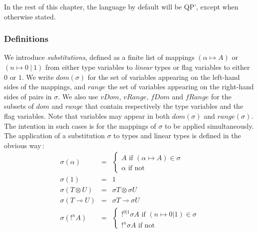In the rest of this chapter, the language by default will be QP', except when otherwise stated.

\subsubsection{Definitions}

\begin{defn} We introduce \textit{substitutions}, defined as a finite list of mappings $(\alpha \mapsto A)$ or $(n \mapsto 0 ~|~ 1)$
	from either type variables to \textit{linear} types 	or flag variables to either $0$ or $1$.
	We write $dom(\sigma)$ for the set of variables appearing on the left-hand sides of the mappings, and $range$ the set of variables appearing
	on the right-hand sides of pairs in $\sigma$. We also use $vDom$, $vRange$, $fDom$ and $fRange$ for the subsets of $dom$ and $range$ that
	contain respectively the type variables and the flag variables. Note that variables may appear in both $dom(\sigma)$ and $range(\sigma)$. The
	intention in such cases is for the mappings of $\sigma$ to be applied simultaneously.
	The application of a substitution $\sigma$ to types and linear types is defined in the obvious way\,:
	$$
	\begin{array}{lcl}
		\sigma (\alpha) &=& \left\{ \begin{array}{l}
		                              A \text{ if } (\alpha \mapsto A) \in \sigma \\
      		                        \alpha \text{ if not}
		                            \end{array} \right. \\
		\sigma(1) &=& 1 \\
		\sigma(T \otimes U) &=& \sigma T \otimes \sigma U \\
		\sigma(T \multimap U) &=& \sigma T \multimap \sigma U \\
		\sigma(!^n A) &=& \left\{ \begin{array}{l}
																	!^{0|1} \sigma A \text{ if } (n \mapsto 0|1) \in \sigma \\
																	!^n \sigma A \text{ if not}
																\end{array} \right. \\
	\end{array}
	$$
	

\end{defn}
